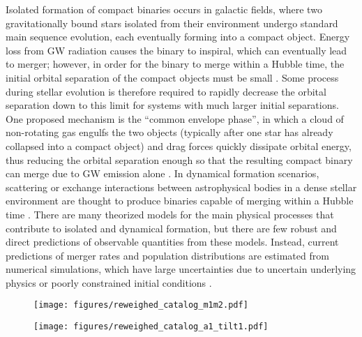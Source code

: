 Isolated formation of compact binaries occurs in galactic fields, where two gravitationally bound stars isolated from their environment undergo standard main sequence evolution, each eventually forming into a compact object. Energy loss from GW radiation causes the binary to inspiral, which can eventually lead to merger; however, in order for the binary to merge within a Hubble time, the initial orbital separation of the compact objects must be small \citep{10.1051/0004-6361/201936204,10.1007/s41114-021-00034-3}. Some process during stellar evolution is therefore required to rapidly decrease the orbital separation down to this limit for systems with much larger initial separations. One proposed mechanism is the ``common envelope phase'', in which a cloud of non-rotating gas engulfs the two objects (typically after one star has already collapsed into a compact object) and drag forces quickly dissipate orbital energy, thus reducing the orbital separation enough so that the resulting compact binary can merge due to GW emission alone \citep{10.1038/nature18322}. In dynamical formation scenarios, scattering or exchange interactions between astrophysical bodies in a dense stellar environment are thought to produce binaries capable of merging within a Hubble time \citep{1602.02444}. There are many theorized models for the main physical processes that contribute to isolated and dynamical formation, but there are few robust and direct predictions of observable quantities from these models. Instead, current predictions of merger rates and population distributions are estimated from numerical simulations, which have large uncertainties due to uncertain underlying physics or poorly constrained initial conditions \citep{10.1007/s41114-021-00034-3, 10.1051/0004-6361/201936204, 1806.00001v3, 1308.1546}. 

\begin{figure}[ht!]
    \begin{centering}
        \texttt{[image: figures/reweighed\_catalog\_m1m2.pdf]}
        \caption{}
        \label{fig:mass_kde}
    \end{centering}
\end{figure}

\begin{figure}[ht!]
    \begin{centering}
        \texttt{[image: figures/reweighed\_catalog\_a1\_tilt1.pdf]}
        \caption{}
        \label{fig:spin_kde}
    \end{centering}
\end{figure}


